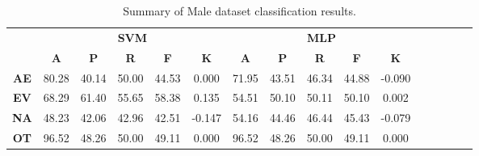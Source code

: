 \begin{landscape}
\begin{table}[htbp]
\footnotesize
\centering
\caption{Summary of Male dataset classification results.}
\label{tab:base_female}
\begin{tabular}{|c|c|c|c|c|c|c|c|c|c|c|c|c|c|c|c|}
\hline
\multirow{2}{*}{}	& \multicolumn{5}{c|}{\textbf{SVM}}												& \multicolumn{5}{c|}{\textbf{MLP}}												\\ \cline{2-11} 
					& \textbf{A}	& \textbf{P}	& \textbf{R}	& \textbf{F}	& \textbf{K}	& \textbf{A}	& \textbf{P}	& \textbf{R}	& \textbf{F}	& \textbf{K}	\\ \hline
\textbf{AE}			& 80.28			& 40.14			& 50.00			& 44.53			& 0.000			& 71.95			& 43.51			& 46.34			& 44.88			& -0.090			\\ \hline
\textbf{EV}			& 68.29			& 61.40			& 55.65			& 58.38			& 0.135			& 54.51			& 50.10			& 50.11			& 50.10			& 0.002			\\ \hline
\textbf{NA}			& 48.23			& 42.06			& 42.96			& 42.51			& -0.147			& 54.16			& 44.46			& 46.44			& 45.43			& -0.079			\\ \hline
\textbf{OT}			& 96.52			& 48.26			& 50.00			& 49.11			& 0.000			& 96.52			& 48.26			& 50.00			& 49.11			& 0.000			\\ \hline
\end{tabular}
\end{table}
\end{landscape}